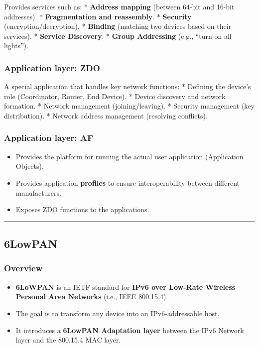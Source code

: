 \documentclass[a4paper, 12pt]{book} %
\begin{document}
Provides services such as: * \textbf{Address mapping} (between 64-bit
and 16-bit addresses). * \textbf{Fragmentation and reassembly}. *
\textbf{Security} (encryption/decryption). * \textbf{Binding} (matching
two devices based on their services). * \textbf{Service Discovery}. *
\textbf{Group Addressing} (e.g., ``turn on all lights'').

\subsubsection{Application layer: ZDO}\label{application-layer-zdo}

A special application that handles key network functions: * Defining the
device's role (Coordinator, Router, End Device). * Device discovery and
network formation. * Network management (joining/leaving). * Security
management (key distribution). * Network address management (resolving
conflicts).

\subsubsection{Application layer: AF}\label{application-layer-af}

\begin{itemize}
\tightlist
\item
  Provides the platform for running the actual user application
  (Application Objects).
\item
  Provides application \textbf{profiles} to ensure interoperability
  between different manufacturers.
\item
  Exposes ZDO functions to the applications.
\end{itemize}

\begin{center}\rule{0.5\linewidth}{0.5pt}\end{center}

\subsection{6LowPAN}\label{lowpan}

\subsubsection{Overview}\label{overview-2}

\begin{itemize}
\tightlist
\item
  \textbf{6LoWPAN} is an IETF standard for \textbf{IPv6 over Low-Rate
  Wireless Personal Area Networks} (i.e., IEEE 800.15.4).
\item
  The goal is to transform any device into an IPv6-addressable host.
\item
  It introduces a \textbf{6LowPAN Adaptation layer} between the IPv6
  Network layer and the 800.15.4 MAC layer.
\end{itemize}
\end{document}
